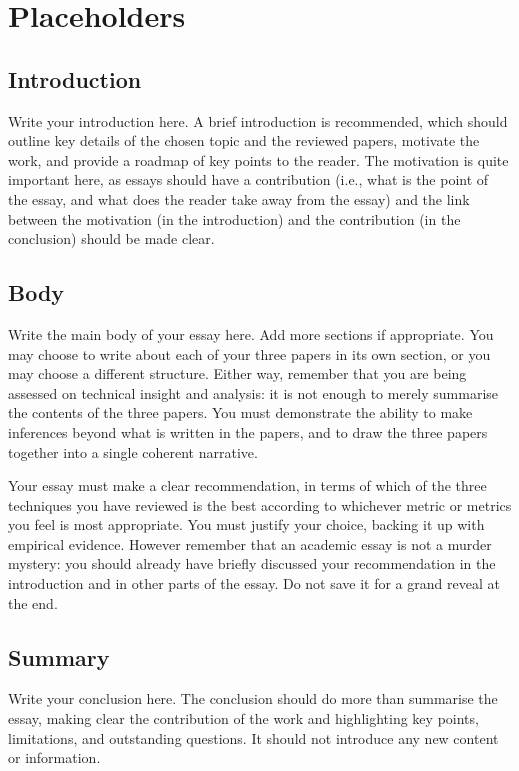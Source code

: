 \documentclass{scrartcl}
\begin{document}
\section{Placeholders}
\subsection{Introduction}
Write your introduction here. A brief introduction is recommended, which should outline key details of the chosen topic and the reviewed papers, motivate the work, and provide a roadmap of key points to the reader. The motivation is quite important here, as essays should have a contribution (i.e., what is the point of the essay, and what does the reader take away from the essay) and the link between the motivation (in the introduction) and the contribution (in the conclusion) should be made clear.

\subsection{Body}
Write the main body of your essay here. Add more sections if appropriate. You may choose to write about each of your three papers in its own section, or you may choose a different structure. Either way, remember that you are being assessed on technical insight and analysis: it is not enough to merely summarise the contents of the three papers. You must demonstrate the ability to make inferences beyond what is written in the papers, and to draw the three papers together into a single coherent narrative.

Your essay must make a clear recommendation, in terms of which of the three techniques you have reviewed is the best according to whichever metric or metrics you feel is most appropriate. You must justify your choice, backing it up with empirical evidence. However remember that an academic essay is not a murder mystery: you should already have briefly discussed your recommendation in the introduction and in other parts of the essay. Do not save it for a grand reveal at the end.

\subsection{Summary}
Write your conclusion here. The conclusion should do more than summarise the essay, making clear the contribution of the work and highlighting key points, limitations, and outstanding questions. It should not introduce any new content or information.



\end{document}
